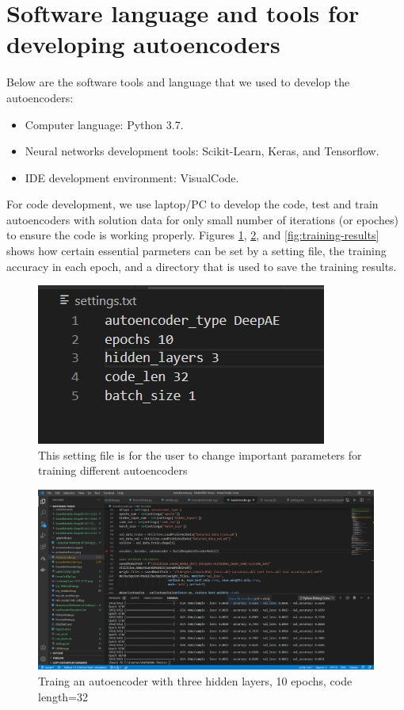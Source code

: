 \documentclass{article}
\begin{document}
\section{Software language and tools for developing autoencoders}
Below are the software tools and language that we used to develop the autoencoders:
\begin{itemize}
	\item Computer language: Python 3.7.
	\item Neural networks development tools: Scikit-Learn, Keras, and Tensorflow.
	\item IDE development environment: VisualCode.
\end{itemize}
For code development, we use laptop/PC to develop the code, test and train autoencoders with solution data for only small number of iterations (or epoches) to ensure the code is working properly. Figures \ref{fig:settings}, \ref{fig:trainging}, and \ref{fig:training-results} shows how certain essential parmeters can be set by a setting file, the training accuracy in each epoch, and a directory that is used to save the training results.
\begin{figure}[h!]
	\includegraphics[width=.75\linewidth]{settings.png}
	\caption{This setting file is for the user to change important parameters for training different autoencoders}
	\label{fig:settings}
\end{figure}
\begin{figure}[h!]
	\includegraphics[width=1\linewidth]{training.png}
	\caption{Traing an autoencoder with three hidden layers, 10 epochs, code length=32}
	\label{fig:trainging}
\end{figure}
\end{document}

